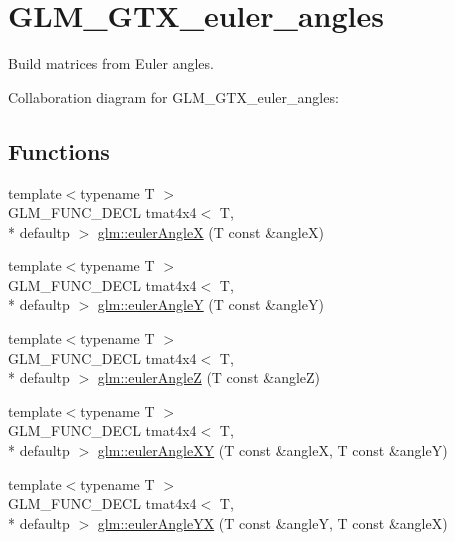 \hypertarget{group__gtx__euler__angles}{\section{G\-L\-M\-\_\-\-G\-T\-X\-\_\-euler\-\_\-angles}
\label{group__gtx__euler__angles}
}


Build matrices from Euler angles.  


Collaboration diagram for G\-L\-M\-\_\-\-G\-T\-X\-\_\-euler\-\_\-angles\-:
\subsection*{Functions}
\begin{DoxyCompactItemize}
\item 
{\footnotesize template$<$typename T $>$ }\\G\-L\-M\-\_\-\-F\-U\-N\-C\-\_\-\-D\-E\-C\-L tmat4x4$<$ T, \\*
defaultp $>$ \hyperlink{group__gtx__euler__angles_ga82cd3b8a04943f1a0d1a562aff358dc8}{glm\-::euler\-Angle\-X} (T const \&angle\-X)
\item 
{\footnotesize template$<$typename T $>$ }\\G\-L\-M\-\_\-\-F\-U\-N\-C\-\_\-\-D\-E\-C\-L tmat4x4$<$ T, \\*
defaultp $>$ \hyperlink{group__gtx__euler__angles_gaeb193af1184bdf39c23636d756e1ff33}{glm\-::euler\-Angle\-Y} (T const \&angle\-Y)
\item 
{\footnotesize template$<$typename T $>$ }\\G\-L\-M\-\_\-\-F\-U\-N\-C\-\_\-\-D\-E\-C\-L tmat4x4$<$ T, \\*
defaultp $>$ \hyperlink{group__gtx__euler__angles_gab59c4fe7f735568255cc19fddd3ddfcd}{glm\-::euler\-Angle\-Z} (T const \&angle\-Z)
\item 
{\footnotesize template$<$typename T $>$ }\\G\-L\-M\-\_\-\-F\-U\-N\-C\-\_\-\-D\-E\-C\-L tmat4x4$<$ T, \\*
defaultp $>$ \hyperlink{group__gtx__euler__angles_ga8bf84f92ca976a7f50dbe4b30ceb72dd}{glm\-::euler\-Angle\-X\-Y} (T const \&angle\-X, T const \&angle\-Y)
\item 
{\footnotesize template$<$typename T $>$ }\\G\-L\-M\-\_\-\-F\-U\-N\-C\-\_\-\-D\-E\-C\-L tmat4x4$<$ T, \\*
defaultp $>$ \hyperlink{group__gtx__euler__angles_gafdd02f9a37511190962119adef5c1c25}{glm\-::euler\-Angle\-Y\-X} (T const \&angle\-Y, T const \&angle\-X)

\end{DoxyCompactItemize}
